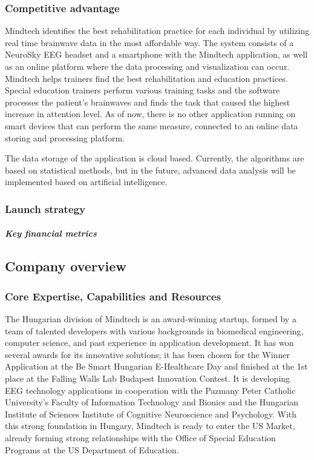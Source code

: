 \documentclass[letterpaper,10pt]{article}
\let\oldsubsection\subsection
\renewcommand{\subsection}{\def\cursectioning{subsection}\oldsubsection}
\begin{document}
\subsubsection{Competitive advantage}

Mindtech identifies the best rehabilitation practice for each individual by utilizing real time brainwave data in the most affordable way. The system consists of a NeuroSky EEG headset and a smartphone with the Mindtech application, as well as an online platform where the data processing and visualization can occur. Mindtech helps trainers find the best rehabilitation and education practices. Special education trainers perform various training tasks and the software processes the patient's brainwaves and finds the task that caused the highest increase in attention level. As of now, there is no other application running on smart devices that can perform the same measure, connected to an online data storing and processing platform. 

The data storage of the application is cloud based. Currently, the algorithms are based on statistical methods, but in the future, advanced data analysis will be implemented based on artificial intelligence.

\subsubsection{Launch strategy}

\subparagraph{Key financial metrics}

\subsection{Company overview} %

\subsubsection{Core Expertise, Capabilities and Resources}

The Hungarian division of Mindtech is an award-winning startup, formed by a team of talented developers with various backgrounds in biomedical engineering, computer science, and past experience in application development. It has won  several awards for its innovative solutions; it has been chosen for the Winner Application at the Be Smart Hungarian E-Healthcare Day and finished at the 1st place at the Falling Walls Lab Budapest Innovation Contest. It is developing EEG technology applications in cooperation with the Pazmany Peter Catholic University’s Faculty of Information Technology and Bionics and the Hungarian Institute of Sciences Institute of Cognitive Neuroscience and Psychology. With this strong foundation in Hungary, Mindtech is ready to enter the US Market, already forming strong relationships with the Office of Special Education Programs at the US Department of Education.  
\end{document}
